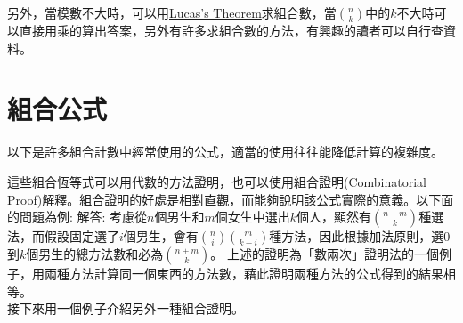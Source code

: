 另外，當模數不大時，可以用\href{https://en.wikipedia.org/wiki/Lucas\%27s_theorem}{Lucas's Theorem}求組合數，當$\binom{n}{k}$中的$k$不大時可以直接用乘的算出答案，另外有許多求組合數的方法，有興趣的讀者可以自行查資料。

\section{組合公式}
以下是許多組合計數中經常使用的公式，適當的使用往往能降低計算的複雜度。

這些組合恆等式可以用代數的方法證明，也可以使用組合證明(Combinatorial Proof)解釋。組合證明的好處是相對直觀，而能夠說明該公式實際的意義。以下面的問題為例:
解答: 考慮從$n$個男生和$m$個女生中選出$k$個人，顯然有$\binom{n+m}{k}$種選法，而假設固定選了$i$個男生，會有$\binom{n}{i}\binom{m}{k-i}$種方法，因此根據加法原則，選$0$到$k$個男生的總方法數和必為$\binom{n+m}{k}$。
上述的證明為「數兩次」證明法的一個例子，用兩種方法計算同一個東西的方法數，藉此證明兩種方法的公式得到的結果相等。\\
接下來用一個例子介紹另外一種組合證明。

